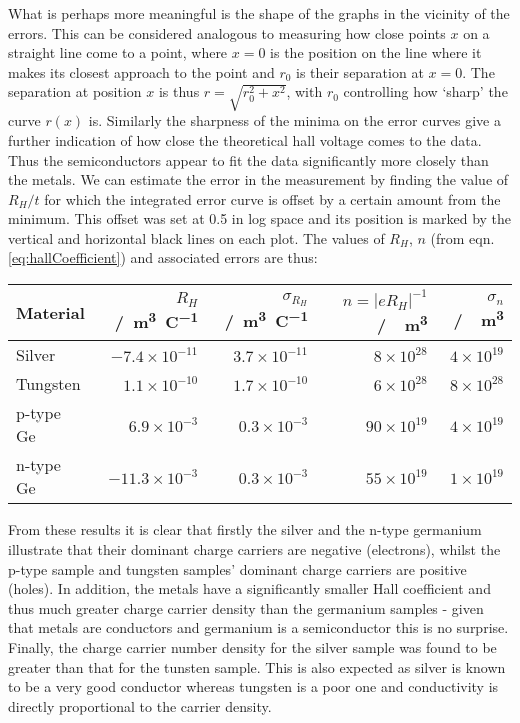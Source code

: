 \documentclass[a4paper]{article}
\begin{document}
			What is perhaps more meaningful is the shape of the graphs in the vicinity of the errors. This can be considered analogous to measuring how close points $x$ on a straight line come to a point, where $x=0$ is the position on the line where it makes its closest approach to the point and $r_0$ is their separation at $x=0$. The separation at position $x$ is thus $r=\sqrt{r_0^2+x^2}$, with $r_0$ controlling how `sharp' the curve $r(x)$ is. Similarly the sharpness of the minima on the error curves give a further indication of how close the theoretical hall voltage comes to the data. Thus the semiconductors appear to fit the data significantly more closely than the metals. We can estimate the error in the measurement by finding the value of $R_H/t$ for which the integrated error curve is offset by a certain amount from the minimum. This offset was set at 0.5 in log space and its position is marked by the vertical and horizontal black lines on each plot. The values of $R_H$, $n$ (from eqn. \ref{eq:hallCoefficient}) and associated errors are thus:
			
			\begin{table}[h!]
				\begin{center}
					\begin{tabular}{|l|r|r|r|r|}
					\hline
					Material  & $R_H$ /\SI{}{\cubic\metre\per\coulomb} & $\sigma_{R_H}$ /\SI{}{\cubic\metre\per\coulomb} &  $n=|eR_H|^{-1}$ /\SI{}{\per\cubic\metre} & $\sigma_n$ /\SI{}{\per\cubic\metre} \\ \hline
					Silver    & $-7.4\times 10^{-11}$ & $3.7\times 10^{-11}$ & $8\times 10^{28}$ & $4\times 10^{19}$ \\
					Tungsten  & $1.1\times 10^{-10}$ & $1.7\times 10^{-10}$ & $6\times 10^{28}$ & $8\times 10^{28}$ \\
					p-type Ge & $6.9\times 10^{-3}$ & $0.3\times 10^{-3}$ & $90\times 10^{19}$ & $4\times 10^{19}$ \\
					n-type Ge & $-11.3\times 10^{-3}$ & $0.3\times 10^{-3}$ & $55\times 10^{19}$ & $1\times 10^{19}$ \\ \hline	
					\end{tabular}
				\end{center}
				\label{table:hallConstants}
			\end{table}
			
			\noindent From these results it is clear that firstly the silver and the n-type germanium illustrate that their dominant charge carriers are negative (electrons), whilst the p-type sample and tungsten samples' dominant charge carriers are positive (holes). In addition, the metals have a significantly smaller Hall coefficient and thus much greater charge carrier density than the germanium samples - given that metals are conductors and germanium is a semiconductor this is no surprise. Finally, the charge carrier number density for the silver sample was found to be greater than that for the tunsten sample. This is also expected as silver is known to be a very good conductor whereas tungsten is a poor one and conductivity is directly proportional to the carrier density.
	
\end{document}
